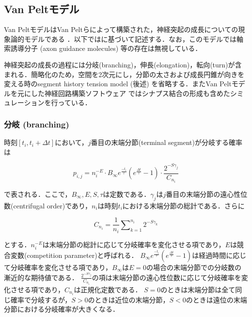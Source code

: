 \subsection{Van Peltモデル}
Van PeltモデルはVan Peltらによって構築された，神経突起の成長についての現象論的モデルである \cite{Van_Pelt2002-vm}．以下では\cite{Koene2009-hv}に基づいて記述する．なお，このモデルでは軸索誘導分子 (axon guidance molecules) 等の存在は無視している．

神経突起の成長の過程には分岐(branching)，伸長(elongation)，転向(turn)が含まれる．簡略化のため，空間を2次元にし，分節の太さおよび成長円錐が向きを変える時のsegment history tension model (後述) を省略する．またVan Peltモデルを元にした神経回路構築ソフトウェア\textbf{} \cite{Koene2009-hv}ではシナプス結合の形成も含めたシミュレーションを行っている．

\subsubsection{分岐 (branching)}
時刻$[t_i, t_i + \Delta t]$において，$j$番目の末端分節(terminal segment)が分岐する確率は


\begin{equation}
p_{i,j} = n_i^{-E}\cdot B_{\infty} e^{\frac{-t_i}{\tau}} \left(e^{\frac{\Delta t}{\tau}} - 1\right)\cdot \frac{2^{-S\gamma_j}}{C_{n_i}}
\end{equation}


で表される．ここで，$B_{\infty}, E, S, \tau$は定数である．$\gamma_j$は$j$番目の末端分節の遠心性位数(centrifugal order)であり，$n_i$は時刻$t_i$における末端分節の総計である．さらに


\begin{equation}
{C_{n_i}} = \frac{1}{n_i}\sum\nolimits_{k = 1}^{n_i} {{2^{ - S{\gamma_k}}}}
\end{equation}


とする．$n_i^{-E}$は末端分節の総計に応じて分岐確率を変化させる項であり，$E$は競合変数(competition parameter)と呼ばれる．
$B_{\infty} e^{\frac{-t_i}{\tau}} \left(e^{\frac{\Delta t}{\tau}} - 1\right)$は経過時間に応じて分岐確率を変化させる項であり，$B_{\infty}$は$E=0$の場合の末端分節での分岐数の漸近的な期待値である．
$\frac{2^{-S\gamma_j}}{C_{n_i}}$の項は末端分節の遠心性位数に応じて分岐確率を変化させる項であり，$C_{n_i}$は正規化定数である．
$S=0$のときは末端分節は全て同じ確率で分岐するが，$S>0$のときは近位の末端分節，$S<0$のときは遠位の末端分節における分岐確率が大きくなる．

